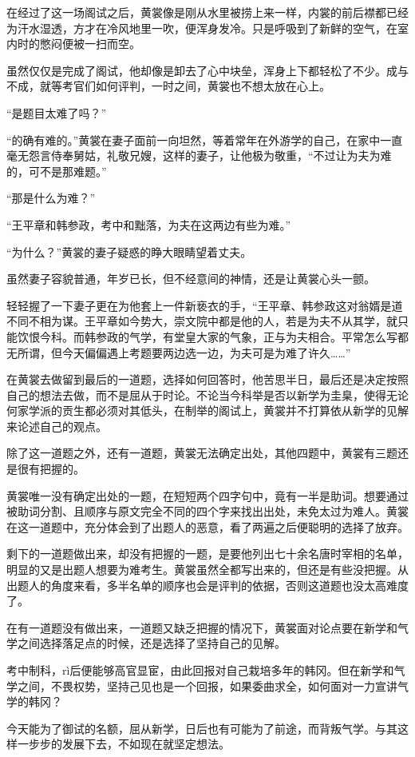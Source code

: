 在经过了这一场阁试之后，黄裳像是刚从水里被捞上来一样，内裳的前后襟都已经为汗水湿透，方才在冷风地里一吹，便浑身发冷。只是呼吸到了新鲜的空气，在室内时的憋闷便被一扫而空。

虽然仅仅是完成了阁试，他却像是卸去了心中块垒，浑身上下都轻松了不少。成与不成，就等考官们如何评判，一时之间，黄裳也不想太放在心上。

“是题目太难了吗？”

“的确有难的。”黄裳在妻子面前一向坦然，等着常年在外游学的自己，在家中一直毫无怨言侍奉舅姑，礼敬兄嫂，这样的妻子，让他极为敬重，“不过让为夫为难的，可不是那难题。”

“那是什么为难？”

“王平章和韩参政，考中和黜落，为夫在这两边有些为难。”

“为什么？”黄裳的妻子疑惑的睁大眼睛望着丈夫。

虽然妻子容貌普通，年岁已长，但不经意间的神情，还是让黄裳心头一颤。

轻轻握了一下妻子更在为他套上一件新亵衣的手，“王平章、韩参政这对翁婿是道不同不相为谋。王平章如今势大，崇文院中都是他的人，若是为夫不从其学，就只能饮恨今科。而韩参政的气学，有堂皇大家的气象，正与为夫相合。平常怎么写都无所谓，但今天偏偏遇上考题要两边选一边，为夫可是为难了许久……”

在黄裳去做留到最后的一道题，选择如何回答时，他苦思半日，最后还是决定按照自己的想法去做，而不是屈从于时论。不论当今科举是否以新学为圭臬，使得无论何家学派的贡生都必须对其低头，在制举的阁试上，黄裳并不打算依从新学的见解来论述自己的观点。

除了这一道题之外，还有一道题，黄裳无法确定出处，其他四题中，黄裳有三题还是很有把握的。

黄裳唯一没有确定出处的一题，在短短两个四字句中，竟有一半是助词。想要通过被助词分割、且顺序与原文完全不同的四个字来找出出处，未免太过为难人。黄裳在这一道题中，充分体会到了出题人的恶意，看了两遍之后便聪明的选择了放弃。

剩下的一道题做出来，却没有把握的一题，是要他列出七十余名唐时宰相的名单，明显的又是出题人想要为难考生。黄裳虽然全都写出来的，但还是有些没把握。从出题人的角度来看，多半名单的顺序也会是评判的依据，否则这道题也没太高难度了。

在有一道题没有做出来，一道题又缺乏把握的情况下，黄裳面对论点要在新学和气学之间选择落足点的时候，还是选择了坚持自己的见解。

考中制科，rì后便能够高官显宦，由此回报对自己栽培多年的韩冈。但在新学和气学之间，不畏权势，坚持己见也是一个回报，如果委曲求全，如何面对一力宣讲气学的韩冈？

今天能为了御试的名额，屈从新学，日后也有可能为了前途，而背叛气学。与其这样一步步的发展下去，不如现在就坚定想法。

